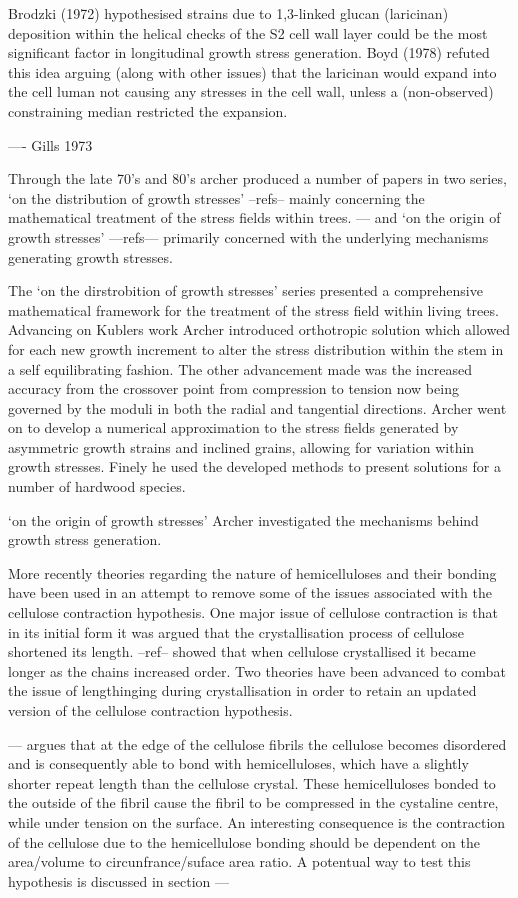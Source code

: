 \documentclass{article}
\begin{document}
Brodzki (1972) hypothesised strains due to 1,3-linked glucan (laricinan)
deposition within the helical checks of the S2 cell wall layer could be the
most significant factor in longitudinal growth stress generation. Boyd (1978)
refuted this idea arguing (along with other issues) that the laricinan would
expand into the cell luman not causing any stresses in the cell wall, unless a
(non-observed) constraining median restricted the expansion.

---- Gills 1973

Through the late 70's and 80's archer produced a number of papers in two series,
`on the distribution of growth stresses' --refs-- mainly concerning the
mathematical treatment of the stress fields within trees. --- and `on the
origin of growth stresses' ---refs--- primarily concerned with the underlying
mechanisms generating growth stresses.

The `on the dirstrobition of growth stresses' series presented a comprehensive
mathematical framework for the treatment of the stress field within living
trees. Advancing on Kublers work Archer introduced orthotropic solution which
allowed for each new growth increment to alter the stress distribution within
the stem in a self equilibrating fashion. The other advancement made was the
increased accuracy from the crossover point from compression to tension now being
governed by the moduli in both the radial and tangential directions.
Archer went on to develop a numerical approximation to the stress fields
generated by asymmetric growth strains and inclined grains, allowing for
variation within growth stresses. Finely he used the developed methods to
present solutions for a number of hardwood species.

`on the origin of growth stresses' Archer investigated the mechanisms behind
growth stress generation.

More recently theories regarding the nature of hemicelluloses and their bonding
have been used in an attempt to remove some of the issues associated with the
cellulose contraction hypothesis. One major issue of cellulose contraction is
that in its initial form it was argued that the crystallisation process of cellulose
shortened its length. --ref-- showed that when cellulose crystallised it became
longer as the chains increased order. Two theories have been advanced to combat
the issue of lengthinging during crystallisation in order to retain an updated
version of the cellulose contraction hypothesis.

--- argues that at the edge of the cellulose fibrils the cellulose becomes
disordered and is consequently able to bond with hemicelluloses, which have a
slightly shorter repeat length than the cellulose crystal. These hemicelluloses
bonded to the outside of the fibril cause the fibril to be compressed in the
cystaline centre, while under tension on the surface. An interesting consequence
is the contraction of the cellulose due to the hemicellulose bonding should be
dependent on the area/volume to circunfrance/suface area ratio. A potentual way
to test this hypothesis is discussed in section ---
\end{document}
